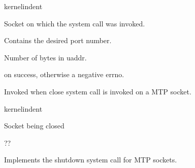 \documentclass[letterpaper,10pt,english]{sphinxmanual}
\begin{document}
\begin{sphinxuseclass}{kernelindent}
\sphinxAtStartPar
{}
\begin{description}
\sphinxAtStartPar
Socket on which the system call was invoked.

\sphinxAtStartPar
Contains the desired port number.

\sphinxAtStartPar
Number of bytes in uaddr.

\end{description}

\sphinxAtStartPar
{}

 on success, otherwise a negative errno.

\end{sphinxuseclass}

\begin{fulllineitems}
\label{\detokenize{mtpimpl.c:c.MTP_close}}
\pysigstartsignatures
\pysigstartmultiline
{}
\pysigstopmultiline
\pysigstopsignatures
\sphinxAtStartPar
Invoked when close system call is invoked on a MTP socket.

\end{fulllineitems}


\begin{sphinxuseclass}{kernelindent}
\sphinxAtStartPar
{}
\begin{description}
\sphinxAtStartPar
Socket being closed

\sphinxAtStartPar
??

\end{description}

\end{sphinxuseclass}

\begin{fulllineitems}
\label{\detokenize{mtpimpl.c:c.MTP_shutdown}}
\pysigstartsignatures
\pysigstartmultiline
{}
\pysigstopmultiline
\pysigstopsignatures
\sphinxAtStartPar
Implements the shutdown system call for MTP sockets.

\end{fulllineitems}
\end{document}
